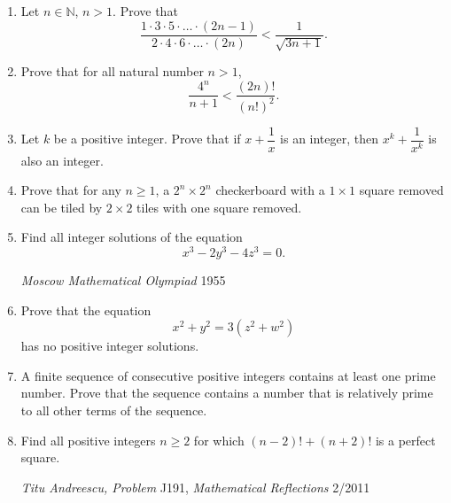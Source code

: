 \documentclass[12pt,a4paper,twoside]{article}
\theoremstyle{remark}
\begin{document}
\begin{enumerate}
\item Let $n\in \mathbb{N}$, $n > 1$. Prove that
$$\frac{1\cdot 3\cdot 5\cdot \ldots \cdot (2n - 1)}{2\cdot 4\cdot 6\cdot \ldots \cdot (2n)} < \frac{1}{\sqrt{3n + 1}}.$$

\item Prove that for all natural number $n > 1$, $$\frac{4^n}{n + 1} < \frac{(2n)!}{(n!)^2}.$$

\item Let $k$ be a positive integer. Prove that if $x + \dfrac{1}{x}$ is an integer, then $x^k+\dfrac{1}{x^k}$ is also an integer.

\item Prove that for any $n\ge1$, a $2^n\times2^n$ checkerboard with a $1\times1$ square removed can be tiled by $2 \times 2$ tiles with one square removed.

\item Find all integer solutions of the equation $$x^3 - 2y^3 - 4z^3=0.$$
\begin{flushright}
\emph{Moscow Mathematical Olympiad} 1955
\end{flushright}

\item Prove that the equation $$x^2 + y^2 = 3(z^2 + w^2)$$ has no positive integer solutions.

\item A finite sequence of consecutive positive integers contains at least one prime number. Prove that the sequence contains a number that is relatively prime to all other terms of the sequence.

\item Find all positive integers $n\geq 2$ for which $(n-2)!+(n+2)!$ is a perfect square.
\begin{flushright}
\emph{Titu Andreescu, Problem} J191, \emph{Mathematical Reflections} 2/2011
\end{flushright}

\end{enumerate}

\newpage
\end{document}
